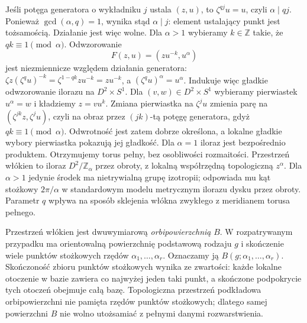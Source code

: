 \begin{uwaga}
Jeśli potęga generatora o wykładniku $j$ ustala $(z,u)$, to
$\zeta^{qj}u=u$, czyli $\alpha\mid qj$. Ponieważ
$\gcd(\alpha,q)=1$, wynika stąd $\alpha\mid j$:
element ustalający punkt jest tożsamością.
Działanie jest więc wolne. Dla $\alpha>1$ wybieramy
$k\in\mathbb Z$ takie, że $qk\equiv1\pmod\alpha$.
Odwzorowanie
\[
F(z,u)=(zu^{-k},u^\alpha)
\]
jest niezmiennicze względem działania generatora:
$\zeta z(\zeta^qu)^{-k}=\zeta^{1-qk}zu^{-k}=zu^{-k}$,
a $(\zeta^qu)^\alpha=u^\alpha$.
Indukuje więc gładkie odwzorowanie ilorazu na
$D^2\times S^1$. Dla $(v,w)\in D^2\times S^1$
wybieramy pierwiastek $u^\alpha=w$ i kładziemy
$z=vu^k$. Zmiana pierwiastka na $\zeta^j u$
zmienia parę na $(\zeta^{jk}z,\zeta^ju)$,
czyli na obraz przez $(jk)$-tą potęgę generatora,
gdyż $qk\equiv1\pmod\alpha$.
Odwrotność jest zatem dobrze określona,
a lokalne gładkie wybory pierwiastka pokazują
jej gładkość. Dla $\alpha=1$ iloraz jest
bezpośrednio produktem. Otrzymujemy torus pełny,
bez osobliwości rozmaitości. Przestrzeń włókien
to iloraz $D^2/\mathbb Z_\alpha$ przez obroty,
z lokalną współrzędną topologiczną $z^\alpha$.
Dla $\alpha>1$ jedynie środek ma nietrywialną
grupę izotropii; odpowiada mu kąt stożkowy
$2\pi/\alpha$ w standardowym modelu metrycznym
ilorazu dysku przez obroty. Parametr $q$ wpływa na sposób sklejenia
włókna zwykłego z meridianem torusa pełnego.
\end{uwaga}

Przestrzeń włókien jest dwuwymiarową \emph{orbipowierzchnią}
$B$. W rozpatrywanym przypadku ma orientowalną powierzchnię
podstawową rodzaju $g$ i skończenie wiele punktów stożkowych
rzędów $\alpha_1,\ldots,\alpha_r$. Oznaczamy ją
$B(g;\alpha_1,\ldots,\alpha_r)$. Skończoność
zbioru punktów stożkowych wynika ze zwartości:
każde lokalne otoczenie w bazie zawiera co najwyżej
jeden taki punkt, a skończone podpokrycie tych
otoczeń obejmuje całą bazę. Topologiczna
przestrzeń podkładowa orbipowierzchni nie pamięta rzędów
punktów stożkowych; dlatego samej powierzchni $B$ nie wolno
utożsamiać z pełnymi danymi rozwarstwienia.

